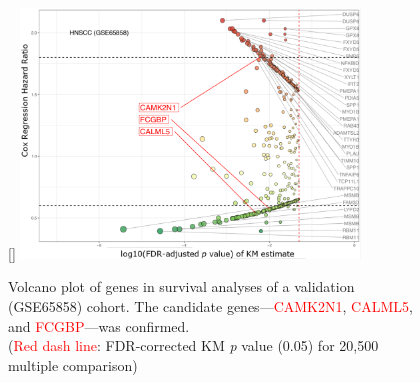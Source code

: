 \documentclass[
paper=landscape,
paper=160mm:90mm, %
fontsize=11pt, %
pagesize, %
parskip=half-, %
]{scrartcl} %
\theoremstyle{mythmstyle} %
\begin{document}
%
\clearpage

\thispagestyle{headings}

\begin{figure}[ht]
[\FBwidth]
{    \includegraphics[width=9cm]{Rplot_GSE65858_CoxHR_CAMK2N1_top3FDRKM.pdf}}
{\captionsetup{labelformat=empty}    \caption{Volcano plot of genes in survival analyses of a validation (GSE65858) cohort.
The candidate genes---\textcolor{red}{CAMK2N1}, \textcolor{red}{CALML5}, and \textcolor{red}{FCGBP}---was confirmed.\\
    (\textcolor{red}{Red dash line}: FDR-corrected KM \textit{p} value (0.05) for 20,500 multiple comparison)
    }}
\end{figure}



\clearpage
%
\thispagestyle{headings}
\end{document}
